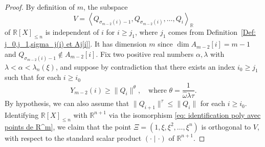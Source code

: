 \documentclass[JEP,XML,SOM,Unicode,NoFloatCountersInSection,published]{cedram}
\newcommand\bR{\mathbb{R}}
\newcommand\homega{\widehat{\omega}}\newcommand\HH{\mathcal{H}}
\newcommand{\normH}[1]{\|#1\|}
\newcommand{\psc}[2]{\left(#1 \mid #2\right)}
\newcommand{\Vect}[2][]{\left\la #2\right\ra_{#1}}
\let\la\langle
\let\ra\rangle
\theoremstyle{definition}
\theoremstyle{plain}
\begin{document}
\begin{proof}
By definition of $m$, the subspace
\begin{equation}
\label{eq proof: def V}
V = \Vect[\bR]{Q_{\sigma_{m-2}(i)-1},Q_{\sigma_{m-2}(i)},\dots,Q_{i}}
\end{equation}
of $\bR[X]_{\leq n}$ is independent of $i$ for $i\geq j_1$, where $j_1$ comes from Definition~\ref{Def: j_0,j_1,sigma_j(i) et Aj[i]}. It has dimension $m$ since $\dim A_{m-2}[i] = m-1$ and $Q_{\sigma_{m-2}(i)-1}\notin A_{m-2}[i]$. Fix two positive real numbers $\alpha,\lambda$ with $\lambda < \alpha < \lambda_n(\xi)$, and suppose by contradiction that there exists an index $i_0\geq j_1$ such that for each $i \geq i_0$
\begin{equation}
\label{eq proof: def theta}
Y_{m-2}(i) \geq \normH{Q_i}^\theta, \quad \textrm{where } \theta=\frac{1}{\homega\lambda\tau}.
\end{equation}
By hypothesis, we can also assume that $\normH{Q_{i+1}}^\tau \leq \normH{Q_i}$ for each $i\geq i_0$. Identifying $\bR[X]_{\leq n}$ with $\bR^{n+1}$ via the isomorphism \eqref{eq: identification poly avec points de R^m}, we claim that the point $\Xi=(1,\xi,\xi^2,\dots,\xi^n)$ is orthogonal to $V$, with respect to the standard scalar product $\psc{\cdot}{\cdot}$ of $\bR^{n+1}$.


\end{proof}
\end{document}
